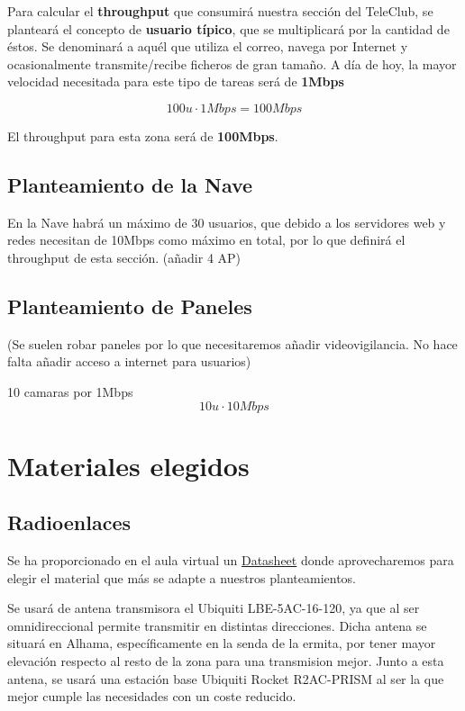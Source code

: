 \documentclass{article}
\begin{document}
Para calcular el \textbf{throughput} que consumirá nuestra sección del TeleClub, se planteará el concepto de \textbf{usuario típico}, que se multiplicará por la cantidad de éstos. Se denominará a aquél que utiliza el correo, navega por Internet y ocasionalmente transmite/recibe ficheros de gran tamaño. A día de hoy, la mayor velocidad necesitada para este tipo de tareas será de \textbf{1Mbps}

    $$100u \cdot 1Mbps = 100Mbps$$

El throughput para esta zona será de \textbf{100Mbps}.

\subsection{Planteamiento de la Nave}

En la Nave habrá un máximo de 30 usuarios, que debido a los servidores web y redes necesitan de 10Mbps como máximo en total, por lo que definirá el throughput de esta sección. (añadir 4 AP)

\subsection{Planteamiento de Paneles}

(Se suelen robar paneles por lo que necesitaremos añadir videovigilancia. No hace falta añadir acceso a internet para usuarios)

10 camaras por 1Mbps
$$10u \cdot 10Mbps$$

\section{Materiales elegidos}

\subsection{Radioenlaces}

Se ha proporcionado en el aula virtual un \href{http://www.microcom.com.ar/fotos/ficha7097LBE-M5-23.compressed.pdf}{Datasheet} donde aprovecharemos para elegir el material que más se adapte a nuestros planteamientos. 

\quad

Se usará de antena transmisora el Ubiquiti LBE-5AC-16-120, ya que al ser omnidireccional permite transmitir en distintas direcciones. Dicha antena se situará en Alhama, específicamente en la senda de la ermita, por tener mayor elevación respecto al resto de la zona para una transmision mejor. Junto a esta antena, se usará una estación base Ubiquiti Rocket R2AC-PRISM al ser la que mejor cumple las necesidades con un coste reducido.
\end{document}
